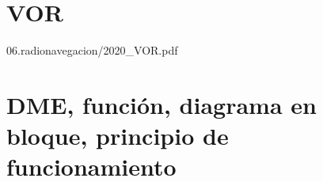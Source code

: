 









 \newpage 

\section{VOR}
\label{sec:06.VOR}

  
  {06.radionavegacion/2020_VOR.pdf}


\clearpage




  
\section{DME, función, diagrama en bloque, principio de funcionamiento}
\label{sec:U06.04.DME}

